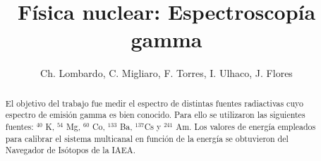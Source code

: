 \documentclass[final,5p,times,twocolumn, 12pt]{elsarticle}
\begin{document}
\begin{frontmatter}



\title{Física nuclear: Espectroscopía gamma}


\author{Ch. Lombardo, C. Migliaro, F. Torres, I. Ulhaco, J. Flores} %


\begin{abstract}
El objetivo del trabajo fue medir el espectro de distintas fuentes radiactivas cuyo espectro de emisión gamma es bien conocido. Para ello se utilizaron las siguientes fuentes: $^{40}$ K, $^{54} $ Mg, $^{60}$ Co, $^{133} $  Ba, $^{137} $Cs y $^{241}$ Am. Los valores de energía empleados para calibrar el sistema multicanal en función de la energía se obtuvieron del Navegador de Isótopos de la IAEA.
\end{abstract}


\end{frontmatter}



%





\end{document}
